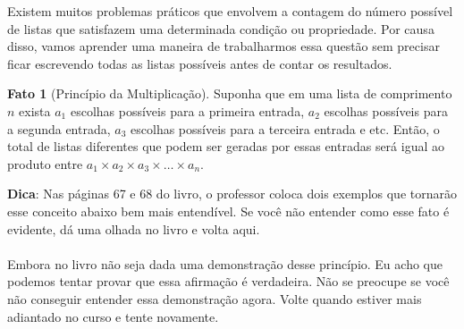 \documentclass[a4paper,11pt,oneside]{book}
\theoremstyle{definition}
\theoremstyle{break}
\newtheorem{fact}{Fato}[section]
\begin{document}
Existem muitos problemas práticos que envolvem a contagem do número possível de listas que satisfazem uma determinada condição ou propriedade. Por causa disso, vamos aprender uma maneira de trabalharmos essa questão sem precisar ficar escrevendo todas as listas possíveis antes de contar os resultados.

\begin{fact}[Princípio da Multiplicação]
Suponha que em uma lista de comprimento $n$ exista $a_1$ escolhas possíveis para a primeira entrada, $a_2$ escolhas possíveis para a segunda entrada, $a_3$ escolhas possíveis para a terceira entrada e etc. Então, o total de listas diferentes que podem ser geradas por essas entradas será igual ao produto entre $a_1 \times a_2 \times a_3 \times \dots \times a_n$. 
\end{fact}

\textbf{Dica}: Nas páginas 67 e 68 do livro, o professor coloca dois exemplos que tornarão esse conceito abaixo bem mais entendível. Se você não entender como esse fato é evidente, dá uma olhada no livro e volta aqui.
\\
\\
Embora no livro não seja dada uma demonstração desse princípio. Eu acho que podemos tentar provar que essa afirmação é verdadeira. Não se preocupe se você não conseguir entender essa demonstração agora. Volte quando estiver mais adiantado no curso e tente novamente.
\end{document}
